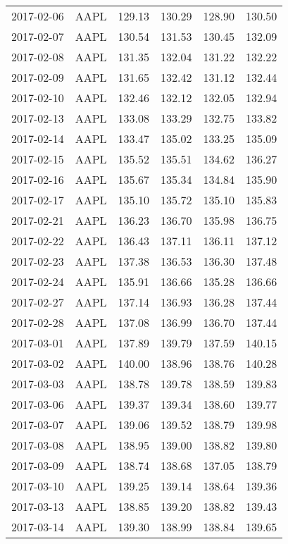 \documentclass[a4paper, 12pt]{report}
\begin{document}
\begin{appendices}
\begin{longtable}{llllll}
  2017-02-06 & AAPL & 129.13 & 130.29 & 128.90 & 130.50 \\ 
  2017-02-07 & AAPL & 130.54 & 131.53 & 130.45 & 132.09 \\ 
  2017-02-08 & AAPL & 131.35 & 132.04 & 131.22 & 132.22 \\ 
  2017-02-09 & AAPL & 131.65 & 132.42 & 131.12 & 132.44 \\ 
  2017-02-10 & AAPL & 132.46 & 132.12 & 132.05 & 132.94 \\ 
  2017-02-13 & AAPL & 133.08 & 133.29 & 132.75 & 133.82 \\ 
  2017-02-14 & AAPL & 133.47 & 135.02 & 133.25 & 135.09 \\ 
  2017-02-15 & AAPL & 135.52 & 135.51 & 134.62 & 136.27 \\ 
  2017-02-16 & AAPL & 135.67 & 135.34 & 134.84 & 135.90 \\ 
  2017-02-17 & AAPL & 135.10 & 135.72 & 135.10 & 135.83 \\ 
  2017-02-21 & AAPL & 136.23 & 136.70 & 135.98 & 136.75 \\ 
  2017-02-22 & AAPL & 136.43 & 137.11 & 136.11 & 137.12 \\ 
  2017-02-23 & AAPL & 137.38 & 136.53 & 136.30 & 137.48 \\ 
  2017-02-24 & AAPL & 135.91 & 136.66 & 135.28 & 136.66 \\ 
  2017-02-27 & AAPL & 137.14 & 136.93 & 136.28 & 137.44 \\ 
  2017-02-28 & AAPL & 137.08 & 136.99 & 136.70 & 137.44 \\ 
  2017-03-01 & AAPL & 137.89 & 139.79 & 137.59 & 140.15 \\ 
  2017-03-02 & AAPL & 140.00 & 138.96 & 138.76 & 140.28 \\ 
  2017-03-03 & AAPL & 138.78 & 139.78 & 138.59 & 139.83 \\ 
  2017-03-06 & AAPL & 139.37 & 139.34 & 138.60 & 139.77 \\ 
  2017-03-07 & AAPL & 139.06 & 139.52 & 138.79 & 139.98 \\ 
  2017-03-08 & AAPL & 138.95 & 139.00 & 138.82 & 139.80 \\ 
  2017-03-09 & AAPL & 138.74 & 138.68 & 137.05 & 138.79 \\ 
  2017-03-10 & AAPL & 139.25 & 139.14 & 138.64 & 139.36 \\ 
  2017-03-13 & AAPL & 138.85 & 139.20 & 138.82 & 139.43 \\ 
  2017-03-14 & AAPL & 139.30 & 138.99 & 138.84 & 139.65 \\ 

\end{longtable}
\end{appendices}
\end{document}
